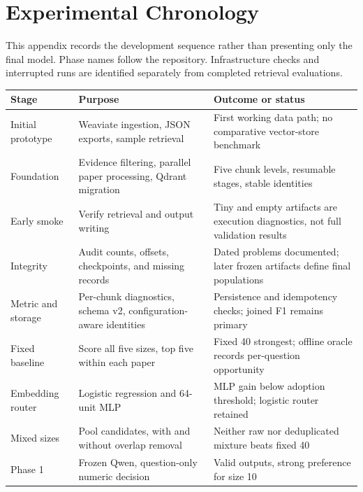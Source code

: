 \chapter{Experimental Chronology}
\label{app:chronology}
This appendix records the development sequence rather than presenting
only the final model. Phase names follow the repository. Infrastructure
checks and interrupted runs are identified separately from completed
retrieval evaluations.

\begin{center}
\small
\captionsetup{hypcap=false}
\label{tab:chronology}
\begin{tabular}{@{}>{\raggedright\arraybackslash}p{2cm}>{\raggedright\arraybackslash}p{5.3cm}>{\raggedright\arraybackslash}p{5.8cm}@{}}
\toprule
Stage & Purpose & Outcome or status\\
\midrule
Initial prototype & Weaviate ingestion, JSON exports, sample retrieval & First working data path; no comparative vector-store benchmark\\
Foundation & Evidence filtering, parallel paper processing, Qdrant migration & Five chunk levels, resumable stages, stable identities\\
Early smoke & Verify retrieval and output writing & Tiny and empty artifacts are execution diagnostics, not full validation results\\
Integrity & Audit counts, offsets, checkpoints, and missing records & Dated problems documented; later frozen artifacts define final populations\\
Metric and storage & Per-chunk diagnostics, schema v2, configuration-aware identities & Persistence and idempotency checks; joined F1 remains primary\\
Fixed baseline & Score all five sizes, top five within each paper & Fixed 40 strongest; offline oracle records per-question opportunity\\
Embedding router & Logistic regression and 64-unit MLP & MLP gain below adoption threshold; logistic router retained\\
Mixed sizes & Pool candidates, with and without overlap removal & Neither raw nor deduplicated mixture beats fixed 40\\
Phase 1 & Frozen Qwen, question-only numeric decision & Valid outputs, strong preference for size 10\\
\bottomrule
\end{tabular}
\end{center}
